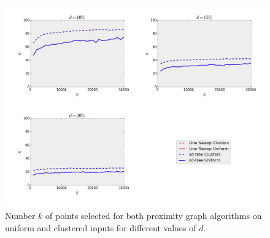 \begin{figure}[!h] 
	\centering
	\includegraphics[width=\linewidth]{Pictures/ls_kd_k} 
	\caption[Number $k$ of points selected for Line Sweep and $k$-d Tree range search.]{Number $k$ of points selected for both proximity graph algorithms on uniform and clustered inputs for different values of $d$.}
	\label{fig:ls_kd_k} 
\end{figure}
